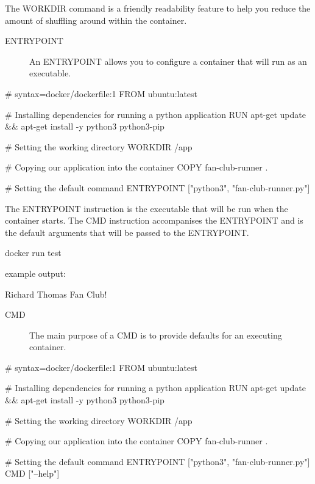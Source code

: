 \documentclass{csse4400}
\begin{document}
The WORKDIR command is a friendly readability feature to help you reduce the amount of shuffling around within the container.
\begin{description}
  \item[ENTRYPOINT] An ENTRYPOINT allows you to configure a container that will run as an executable. \cite{Dockerfile}
\end{description}

\begin{code}[language=docker,numbers=none]{}
  # syntax=docker/dockerfile:1
  FROM ubuntu:latest

  # Installing dependencies for running a python application
  RUN apt-get update && apt-get install -y python3 python3-pip

  # Setting the working directory
  WORKDIR /app

  # Copying our application into the container
  COPY fan-club-runner .

  # Setting the default command
  ENTRYPOINT ["python3", "fan-club-runner.py"]
\end{code}

The ENTRYPOINT instruction is the executable that will be run when the container starts. The CMD instruction accompanises the ENTRYPOINT and is the default arguments that will be passed to the ENTRYPOINT.

\begin{code}[language=shell,numbers=none]{}
  docker run test
\end{code}

example output:

\begin{code}[language=shell,numbers=none]{}
  Richard Thomas Fan Club!
\end{code}

\begin{description}
  \item[CMD] The main purpose of a CMD is to provide defaults for an executing container. \cite{Dockerfile}
\end{description}

\begin{code}[language=docker,numbers=none]{}
  # syntax=docker/dockerfile:1
  FROM ubuntu:latest

  # Installing dependencies for running a python application
  RUN apt-get update && apt-get install -y python3 python3-pip

  # Setting the working directory
  WORKDIR /app

  # Copying our application into the container
  COPY fan-club-runner .

  # Setting the default command
  ENTRYPOINT ["python3", "fan-club-runner.py"]
  CMD ["--help"]
\end{code}
\end{document}
